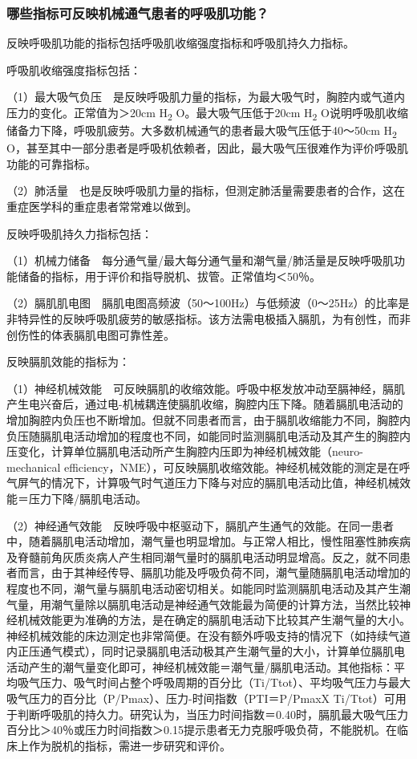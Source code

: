 \subsubsection{哪些指标可反映机械通气患者的呼吸肌功能？}

反映呼吸肌功能的指标包括呼吸肌收缩强度指标和呼吸肌持久力指标。

呼吸肌收缩强度指标包括：

（1）最大吸气负压　是反映呼吸肌力量的指标，为最大吸气时，胸腔内或气道内压力的变化。正常值为＞20cm
H\textsubscript{2} O。最大吸气压低于20cm H\textsubscript{2}
O说明呼吸肌收缩储备力下降，呼吸肌疲劳。大多数机械通气的患者最大吸气压低于40～50cm
H\textsubscript{2}
O，甚至其中一部分患者是呼吸机依赖者，因此，最大吸气压很难作为评价呼吸肌功能的可靠指标。

（2）肺活量　也是反映呼吸肌力量的指标，但测定肺活量需要患者的合作，这在重症医学科的重症患者常常难以做到。

反映呼吸肌持久力指标包括：

（1）机械力储备　每分通气量/最大每分通气量和潮气量/肺活量是反映呼吸肌功能储备的指标，用于评价和指导脱机、拔管。正常值均＜50％。

（2）膈肌肌电图　膈肌电图高频波（50～100Hz）与低频波（0～25Hz）的比率是非特异性的反映呼吸肌疲劳的敏感指标。该方法需电极插入膈肌，为有创性，而非创伤性的体表膈肌电图可靠性差。

反映膈肌效能的指标为：

（1）神经机械效能　可反映膈肌的收缩效能。呼吸中枢发放冲动至膈神经，膈肌产生电兴奋后，通过电-机械耦连使膈肌收缩，胸腔内压下降。随着膈肌电活动的增加胸腔内负压也不断增加。但就不同患者而言，由于膈肌收缩能力不同，胸腔内负压随膈肌电活动增加的程度也不同，如能同时监测膈肌电活动及其产生的胸腔内压变化，计算单位膈肌电活动所产生胸腔内压即为神经机械效能（neuro-mechanical
efficiency，NME），可反映膈肌收缩效能。神经机械效能的测定是在呼气屏气的情况下，计算吸气时气道压力下降与对应的膈肌电活动比值，神经机械效能＝压力下降/膈肌电活动。

（2）神经通气效能　反映呼吸中枢驱动下，膈肌产生通气的效能。在同一患者中，随着膈肌电活动增加，潮气量也明显增加。与正常人相比，慢性阻塞性肺疾病及脊髓前角灰质炎病人产生相同潮气量时的膈肌电活动明显增高。反之，就不同患者而言，由于其神经传导、膈肌功能及呼吸负荷不同，潮气量随膈肌电活动增加的程度也不同，潮气量与膈肌电活动密切相关。如能同时监测膈肌电活动及其产生潮气量，用潮气量除以膈肌电活动是神经通气效能最为简便的计算方法，当然比较神经机械效能更为准确的方法，是在确定的膈肌电活动下比较其产生潮气量的大小。神经机械效能的床边测定也非常简便。在没有额外呼吸支持的情况下（如持续气道内正压通气模式），同时记录膈肌电活动极其产生潮气量的大小，计算单位膈肌电活动产生的潮气量变化即可，神经机械效能＝潮气量/膈肌电活动。其他指标：平均吸气压力、吸气时间占整个呼吸周期的百分比（Ti/Ttot）、平均吸气压力与最大吸气压力的百分比（P/Pmax）、压力-时间指数（PTI＝P/PmaxX
Ti/Ttot）可用于判断呼吸肌的持久力。研究认为，当压力时间指数＝0.40时，膈肌最大吸气压力百分比＞40％或压力时间指数＞0.15提示患者无力克服呼吸负荷，不能脱机。在临床上作为脱机的指标，需进一步研究和评价。

